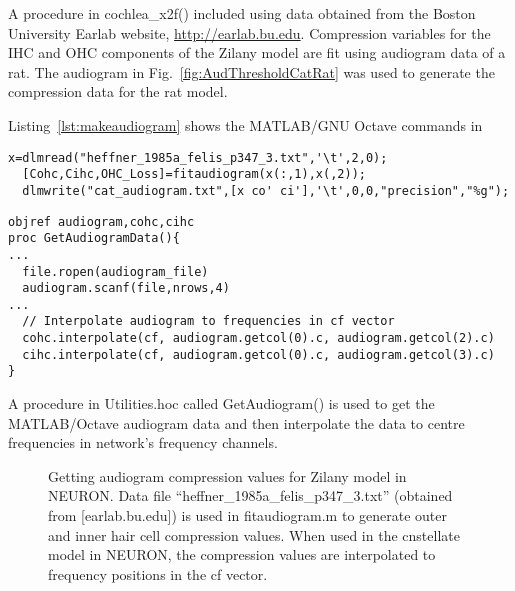 A procedure in \mbox{\textsf{cochlea\_x2f()}} included using data obtained from
the Boston University Earlab website, \url{http://earlab.bu.edu}.
Compression variables for the IHC and OHC components of the Zilany
model are fit using audiogram data of a rat.  The audiogram in
Fig.~\ref{fig:AudThresholdCatRat} was used to generate the compression
data for the rat model.


Listing~\ref{lst:makeaudiogram} shows the MATLAB/GNU Octave commands in
\begin{lstlisting}[label=lst:makeaudiogram,caption=Using \mbox{\textsf{fitaudiogram.m}} to create COHC and CIHC vectors for the cat.]
  x=dlmread("heffner_1985a_felis_p347_3.txt",'\t',2,0);
  [Cohc,Cihc,OHC_Loss]=fitaudiogram(x(:,1),x(,2));
  dlmwrite("cat_audiogram.txt",[x co' ci'],'\t',0,0,"precision","%g");
\end{lstlisting}



\begin{lstlisting}[label=lst:getaudiogramdata,caption= Procedure to get audiogram data and interpolate to frequencies in \textsf{cf} vector (\mbox{\textsf{Utilities.hoc}})]
objref audiogram,cohc,cihc
proc GetAudiogramData(){
...
  file.ropen(audiogram_file)
  audiogram.scanf(file,nrows,4)
...
  // Interpolate audiogram to frequencies in cf vector
  cohc.interpolate(cf, audiogram.getcol(0).c, audiogram.getcol(2).c)
  cihc.interpolate(cf, audiogram.getcol(0).c, audiogram.getcol(3).c)
}
\end{lstlisting}

A procedure in \mbox{\textsf{Utilities.hoc}} called  \mbox{\textsf{GetAudiogram()}} is used
to get the MATLAB/Octave audiogram data and then interpolate the data
to centre frequencies in network's frequency channels.

\begin{figure}[th]
  \begin{center}
    \caption[Zilany auditory model conversion in NEURON]%
    {Getting audiogram compression values for Zilany model in
      NEURON\@.  Data file
      \mbox{\textsf{``heffner\_1985a\_felis\_p347\_3.txt''}} (obtained
      from [earlab.bu.edu]) is used in \textsf{fitaudiogram.m} to
      generate outer and inner hair cell compression values.  When
      used in the \textsf{cnstellate} model in NEURON, the compression
      values are interpolated to frequency positions in the
      \textsf{cf} vector.
\label{fig:GetAudiogram}}
  \end{center}
\end{figure}

